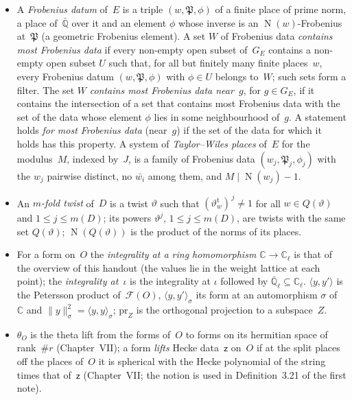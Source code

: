 \documentclass[11pt,a4paper]{article}
\newcommand{\m}[1]{\mbox{$#1$}}        %
\theoremstyle{plainx}
\theoremstyle{uprightx}
\newcommand{\CC}{\mathbb{C}}
\newcommand{\Qb}{\bar{\mathbb{Q}}}
\newcommand{\Qlb}{\bar{\mathbb{Q}}_\ell}
\newcommand{\Cl}{\mathbb{C}_\ell}
\newcommand{\GE}[1]{G_{#1}}
\newcommand{\cj}[1]{\bar{#1}}
\newcommand{\Nm}{\operatorname{N}}
\newcommand{\fP}{\mathfrak{P}}
\newcommand{\Dm}[1]{m(#1)}
\begin{document}
\begin{itemize}[leftmargin=1.6em,itemsep=1pt]
\item A \emph{Frobenius datum} of~$E$ is a triple \m{(w,\fP,\phi)} of a finite place of prime norm, a place
of~\m{\Qb} over it and an element $\phi$ whose inverse is an \m{\Nm(w)}-Frobenius at~$\fP$ (a geometric Frobenius
element). A set $W$ of Frobenius data \emph{contains most Frobenius data} if every non-empty open subset
of~\m{\GE{E}} contains a non-empty open subset $U$ such that, for all but finitely many finite places~$w$, every
Frobenius datum \m{(w,\fP,\phi)} with \m{\phi\in U} belongs to~$W$; such sets form a filter. The set $W$
\emph{contains most Frobenius data near~$g$}, for \m{g\in\GE{E}}, if it contains the intersection of a set that
contains most Frobenius data with the set of the data whose element $\phi$ lies in some neighbourhood of~$g$. A
statement holds \emph{for most Frobenius data} (near~$g$) if the set of the data for which it holds has this
property. A system of
\emph{Taylor--Wiles places} of~$E$ for the modulus~$M$, indexed by~$J$, is a family of Frobenius data
\m{(w_j,\fP_j,\phi_j)} with the $w_j$ pairwise distinct, no \m{\cj{w_i}} among them, and \m{M\mid\Nm(w_j)-1}.
\item An \emph{$m$-fold twist} of~$D$ is a twist $\vartheta$ such that \m{(\vartheta^{\mathrm{t}}_w)^{\,j}\ne1} for all
\m{w\in Q(\vartheta)} and \m{1\le j\le\Dm{D}}; its powers \m{\vartheta^{j}}, \m{1\le j\le\Dm{D}}, are twists with the
same set \m{Q(\vartheta)}; \m{\Nm(Q(\vartheta))} is the product of the norms of its places.
\item For a form on~$O$ the \emph{integrality at a ring homomorphism \m{\CC\to\Cl}} is that of the overview of
this handout (the values lie in the weight lattice at each point); the \emph{integrality at~$\iota$} is the
integrality at $\iota$ followed by \m{\Qlb\subseteq\Cl}. \m{\langle y,y'\rangle} is the Petersson product
of~\m{\mathcal{F}(O)}, \m{\langle y,y'\rangle_\sigma} its form at an automorphism $\sigma$ of~$\CC$ and
\m{\|y\|_\sigma^2=\langle y,y\rangle_\sigma}; \m{\mathrm{pr}_Z} is the orthogonal projection to a subspace~$Z$.
\item \m{\theta_O} is the theta lift from the forms of~$O$ to forms on its hermitian space of rank~\m{\#r}
(Chapter~VII); a form \emph{lifts} Hecke data~$\mathsf{z}$ on~$O$ if at the split places off the places of~$O$ it is
spherical with the Hecke polynomial of the string times that of~$\mathsf{z}$ (Chapter~VII; the notion is used in
Definition~3.21 of the first note).

\end{itemize}
\end{document}
